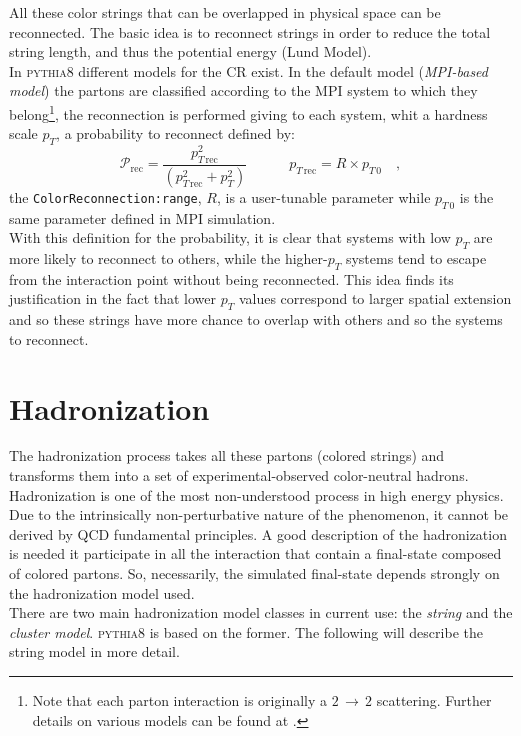 \noindent All these color strings that can be overlapped in physical space can be reconnected.  
The basic idea is to reconnect strings in order to reduce the total string length, and thus the potential energy (Lund Model).
\\
In \textsc{pythia8} different models for the CR exist. In the default model (\textit{MPI-based model}) the partons are classified according to the MPI system to which they belong\footnote{Note that each parton interaction is originally a $2\,\rightarrow\,2$ scattering. Further details on various models can be found at  \cite{CRrecon}.}, the  reconnection is performed giving to each system, whit a hardness scale $p_T$, a probability to reconnect defined by:
\begin{equation}
	\mathcal{P}_{\text{rec}}=\frac{p_{T\,\text{rec}}^2}{\left(p_{T\,\text{rec}}^2 + p_T^2\right)} \qquad\quad p_{T\,\text{rec}}=R\times p_{T\,0}\quad,
\end{equation} 
the \texttt{ColorReconnection:range}, $R$, is a user-tunable parameter while $p_{T\,0}$ is the same parameter defined in MPI simulation.
\\
With this definition for the probability, it is clear that systems with low $p_T$ are more likely to reconnect to others, while the higher-$p_T$ systems tend to escape from the interaction point without being reconnected. This idea finds its justification in the fact that lower $p_T$ values correspond to larger spatial extension and so these strings have more chance to overlap with others and so the systems to reconnect.

\section{Hadronization}


The hadronization process takes all these partons (colored strings) and transforms them into a set of experimental-observed color-neutral hadrons. 
\\
Hadronization is one of the most non-understood process in high energy physics. Due to the intrinsically non-perturbative nature of the phenomenon, it cannot be derived by QCD fundamental principles. A good description of the hadronization is needed it participate in all the interaction that contain a final-state composed of colored partons. So, necessarily, the simulated final-state depends strongly on the hadronization model used.  
\\
There are two main hadronization model classes in current use: the \textit{string} and the \textit{cluster model}. \textsc{pythia8} is based on the former. The following will describe the string model in more detail.

